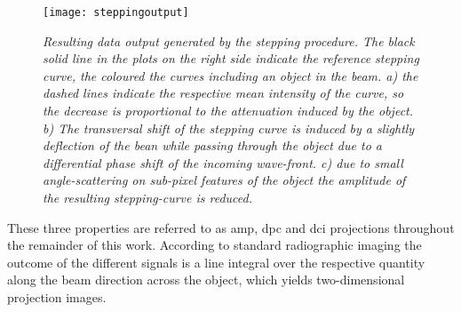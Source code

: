 \begin{figure}%
	\begin{center}
		\texttt{[image: steppingoutput]}
	\end{center}
	\caption[Resulting data output generated by the stepping procedure.]{\textit{Resulting data output generated by the stepping procedure. The black solid line in the plots on the right side indicate the reference stepping curve, the coloured the curves including an object in the beam. a) the dashed lines indicate the respective mean intensity of the curve, so the decrease is proportional to the attenuation induced by the object. b) The transversal shift of the stepping curve is induced by a slightly deflection of the bean while passing through the object due to a differential phase shift of the incoming wave-front. c) due to small angle-scattering on sub-pixel features of the object the amplitude of the resulting stepping-curve is reduced.}}
	\label{AMP;DPC;DCI}
\end{figure}
These three properties are referred to as \acrshort{amp}, \gls{dpc} and \gls{dci} projections throughout the remainder of this work. According to standard radiographic imaging the outcome of the different signals is a line integral over the respective quantity along the beam direction across the object, which yields two-dimensional projection images.
